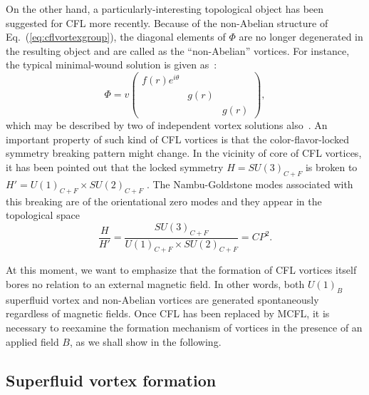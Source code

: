 \documentclass[prd, showpacs,nofootinbib,amsmath,amssymb]{revtex4}
\begin{document}
On the other hand, a particularly-interesting topological object has been suggested for
CFL more recently. Because of the non-Abelian structure of Eq.~(\ref{eq:cflvortexgroup}), the
diagonal elements of $\Phi$ are no longer degenerated in the resulting object and are called as
the ``non-Abelian'' vortices. For instance, the typical minimal-wound solution is given
as~\cite{nakano2008non,eto2009color}:
\begin{equation}
  \label{eq:nvortex}
  \Phi = v\begin{pmatrix}
   f(r)e^{i\theta} & & \\ & g(r) & \\ & & g(r)
  \end{pmatrix},
\end{equation}
which may be described by two of independent vortex solutions also~\cite{balachandran2006semisuperfluid}.
An important property of such kind of CFL vortices
%
is that the color-flavor-locked symmetry breaking pattern might change. In the vicinity of core of CFL
vortices, it has been pointed out that the locked symmetry $H={SU(3)_{C+F}}$ is broken to
$H' =U(1)_{C+F} \times SU(2)_{C+F}$ \cite{nakano2008non,vinci2012spontaneous}.
The Nambu-Goldstone modes associated with this breaking are of the orientational zero modes and they appear in the
topological space
\begin{equation}
  \label{eq:cp2}
 \frac{H}{H'} = \frac{SU(3)_{C+F}}{U(1)_{C+F} \times SU(2)_{C+F}} = CP^2.
\end{equation}

At this moment, we want to emphasize that the formation of CFL vortices itself bores no relation to an
external magnetic field. In other words, both $U(1)_{B}$ superfluid vortex and non-Abelian vortices are
generated spontaneously regardless of magnetic fields.
Once CFL has been replaced by MCFL, it is necessary to reexamine the formation mechanism of vortices in
the presence of an applied field $B$, as we shall show in the following.

\subsection{Superfluid vortex formation }
\label{sssec:4}
\end{document}
